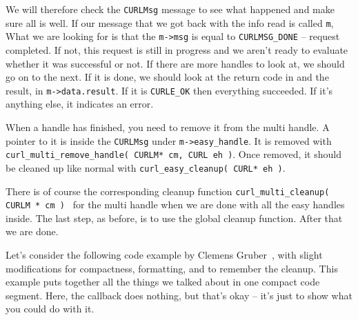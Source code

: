 \documentclass[a4paper]{report}
\begin{document}
We will therefore check the \texttt{CURLMsg} message to see what happened and make sure all is well. If our message that we got back with the info read is called \texttt{m}, What we are looking for is that the \texttt{m->msg} is equal to \texttt{CURLMSG\_DONE} -- request completed. If not, this request is still in progress and we aren't ready to evaluate whether it was successful or not. If there are more handles to look at, we should go on to the next. If it is done, we should look at the return code in and the result, in \texttt{m->data.result}. If it is \texttt{CURLE\_OK} then everything succeeded. If it's anything else, it indicates an error.

When a handle has finished, you need to remove it from the multi handle. A pointer to it is inside the \texttt{CURLMsg} under \texttt{m->easy\_handle}. It is removed with \texttt{curl\_multi\_remove\_handle( CURLM* cm, CURL eh )}. Once removed, it should be cleaned up like normal with \texttt{curl\_easy\_cleanup( CURL* eh )}.

There is of course the corresponding cleanup function \texttt{curl\_multi\_cleanup( CURLM * cm ) } for the multi handle when we are done with all the easy handles inside. The last step, as before, is to use the global cleanup function. After that we are done. 

Let's consider the following code example by Clemens Gruber~\cite{curlmulti}, with slight modifications for compactness, formatting, and to remember the cleanup. This example puts together all the things we talked about in one compact code segment. Here, the callback does nothing, but that's okay -- it's just to show what you could do with it.
\end{document}
